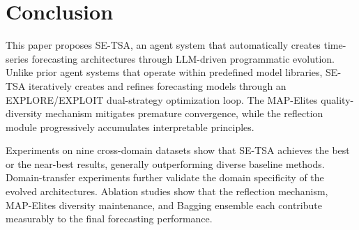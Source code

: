 \section{Conclusion}
This paper proposes SE-TSA, an agent system that automatically creates time-series forecasting architectures through LLM-driven programmatic evolution. Unlike prior agent systems that operate within predefined model libraries, SE-TSA iteratively creates and refines forecasting models through an EXPLORE/EXPLOIT dual-strategy optimization loop. The MAP-Elites quality-diversity mechanism mitigates premature convergence, while the reflection module progressively accumulates interpretable principles.

Experiments on nine cross-domain datasets show that SE-TSA achieves the best or the near-best results, generally outperforming diverse baseline methods. Domain-transfer experiments further validate the domain specificity of the evolved architectures. Ablation studies show that the reflection mechanism, MAP-Elites diversity maintenance, and Bagging ensemble each contribute measurably to the final forecasting performance.